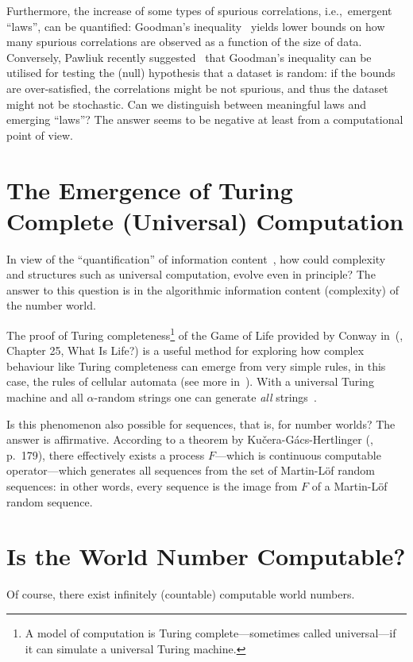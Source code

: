 \documentclass[12pt]{article}
\begin{document}
Furthermore, the increase of some types of spurious correlations, i.e.,~emergent ``laws'', can be quantified:
Goodman's inequality~\cite{Goodman-1959,Schwenk-1972} yields lower bounds on how
many spurious correlations are observed as a function of the size of data.
Conversely, Pawliuk recently suggested~\cite{Pawliuk-2017} that Goodman's inequality can be
utilised for testing the (null) hypothesis that a dataset is random:
if the bounds are over-satisfied,
the correlations might be not
spurious, and thus the dataset might not be stochastic.
Can we distinguish between meaningful laws and emerging ``laws''? The answer seems to be negative at least from a
computational point of view.







\section{The Emergence of Turing Complete (Universal) Computation}
\label{2018-was-sectcfcs}

In view of the ``quantification'' of
information content~\cite{chaitin3,calude:02}, how could complexity and structures such as universal
computation, evolve even in principle?
The answer to this question is in the algorithmic information content (complexity) of the
number world.


The proof of  Turing
completeness\footnote{A model of computation is Turing complete---sometimes called universal---if it can simulate  a universal Turing machine.}
of the Game of Life provided by Conway
in~(\cite[]{berl:82}, Chapter 25, What Is Life?) is a useful method for exploring
how complex behaviour like Turing completeness can emerge from very simple rules,
in this case, the rules of cellular automata (see more in~\cite{univgamelife}).
With a universal  Turing machine
and all $\alpha$-random strings one can generate {\it all} strings~\cite{calude:02}.

Is this phenomenon also possible for sequences, that is, for  number worlds?
The answer is affirmative.
According  to a theorem by Ku\v{c}era-G\'{a}cs-Hertlinger (\cite[]{calude:02}, p.~179), there effectively exists
a process $F$---which is continuous  computable operator---which generates all sequences from the set of Martin-L\"of random sequences: in other words,  every sequence is the image from $F$  of a Martin-L\"of random sequence.


\section{Is the World Number Computable?}
\label{computable}
Of course,
there exist  infinitely (countable) computable world numbers.
\end{document}
